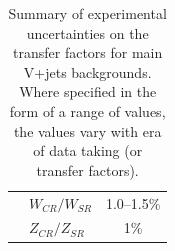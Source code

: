 \begin{table}[htbp]
\begin{center}
\begin{tabular}{llc}
                                & $W_{CR}/W_{SR}$               & 1.0--1.5\% \\
                                & $Z_{CR}/Z_{SR}$				& 1\% \\
       \hline
      \end{tabular}
    \end{center}
        \caption{Summary of experimental uncertainties on the transfer factors for main V+jets backgrounds. Where specified in the form of a range of values, the values vary with era of data taking (or transfer factors).}
    \label{tab:systematics}
\end{table}



